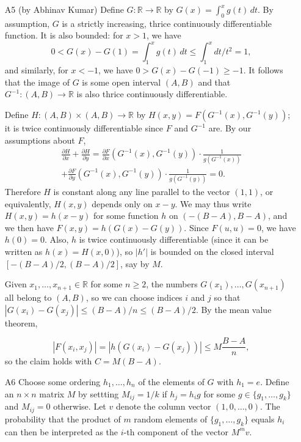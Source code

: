 \documentclass[amssymb,twocolumn,pra,10pt,aps]{revtex4-1}
\newcommand{\RR}{\mathbb{R}}
\begin{document}
\begin{itemize}
\item[A5] (by Abhinav Kumar) Define $G : \RR \to \RR$ by $G(x) = \int_0^x
g(t)\,dt$. By assumption, $G$ is a strictly increasing, thrice continuously
differentiable function. It is also bounded: for $x>1$, we have
\[
0 < G(x)-G(1) = \int_1^x g(t)\,dt \leq \int_1^x dt/t^2 = 1,
\]
and similarly, for $x<-1$, we have $0 > G(x)-G(-1) \geq -1$.
It follows that the image of $G$ is some open interval $(A,B)$
and that $G^{-1}: (A,B) \to \RR$ is also thrice continuously differentiable.

Define $H: (A,B) \times (A,B) \to \RR$ by $H(x,y) = F(G^{-1}(x), G^{-1}(y))$;
it is twice continuously differentiable since $F$ and $G^{-1}$ are.
By our assumptions about $F$,
\begin{multline*}
\frac{\partial H}{\partial x} + \frac{\partial H}{\partial y} =
    \frac{\partial F}{\partial x}(G^{-1}(x), G^{-1}(y))
    \cdot \frac{1}{g(G^{-1}(x))}\\
    + \frac{\partial F}{\partial y}(G^{-1}(x), G^{-1}(y))
    \cdot \frac{1}{g(G^{-1}(y))} = 0.
\end{multline*}
Therefore $H$ is constant along any line parallel to the vector $(1,1)$,
or equivalently, $H(x,y)$ depends only on $x-y$. We may thus write $H(x,y) =
h(x-y)$ for some function $h$ on $(-(B-A), B-A)$, and we then have $F(x,y)
= h(G(x) - G(y))$.  Since $F(u,u) = 0$, we have $h(0) = 0$. Also, $h$
is twice continuously differentiable (since it can be written as $h(x)
= H(x,0)$), so $|h'|$ is bounded on the closed interval $[-(B-A)/2,
(B-A)/2]$, say by $M$.

Given $x_1,\dots,x_{n+1} \in \RR$ for some $n \geq 2$, the numbers
$G(x_1),\dots,G(x_{n+1})$ all belong to $(A,B)$, so we can choose indices
$i$ and $j$ so that $|G(x_i) - G(x_j)| \leq (B-A)/n \leq (B-A)/2$.  By the
mean value theorem,

\[
|F(x_i, x_j)| = |h(G(x_i) - G(x_j))| \leq M \frac{B-A}{n},
\]
so the claim holds with $C = M(B-A)$.

\item[A6]
Choose some ordering $h_1,\dots, h_n$ of the elements of $G$ with $h_1 = e$.
Define an $n \times n$ matrix $M$
by settting $M_{ij} = 1/k$ if $h_j = h_i g$ for some $g \in \{g_1,\dots,g_k\}$ and $M_{ij} = 0$ otherwise.
Let $v$ denote the column vector $(1,0,\dots,0)$. The probability
that the product of $m$ random elements of $\{g_1,\dots,g_k\}$
equals $h_i$ can then be interpreted as the $i$-th component of the vector
$M^m v$.


\end{itemize}
\end{document}
